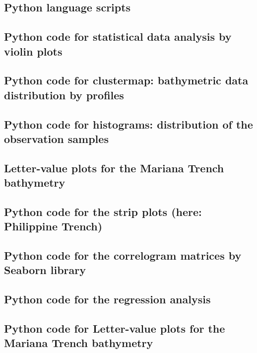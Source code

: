 \documentclass[11pt,a4paper]{report}
\begin{document}
{\begin{appendices}
\section{Python language scripts}

\subsection{Python code for statistical data analysis by violin plots}\label{P:01}


\subsection{Python code for clustermap: bathymetric data distribution by profiles}\label{P:02}


\subsection{Python code for histograms: distribution of the observation samples}\label{P:03}


\subsection{Letter-value plots for the Mariana Trench bathymetry}\label{P:04}

\pagebreak

\subsection{Python code for the strip plots (here: Philippine Trench)}\label{P:05}


\subsection{Python code for the correlogram matrices by Seaborn library}\label{P:06}


\subsection{Python code for the regression analysis}\label{P:07}	


\subsection{Python code for Letter-value plots for the Mariana Trench bathymetry}\label{P:08}	



\end{appendices}}
\end{document}
